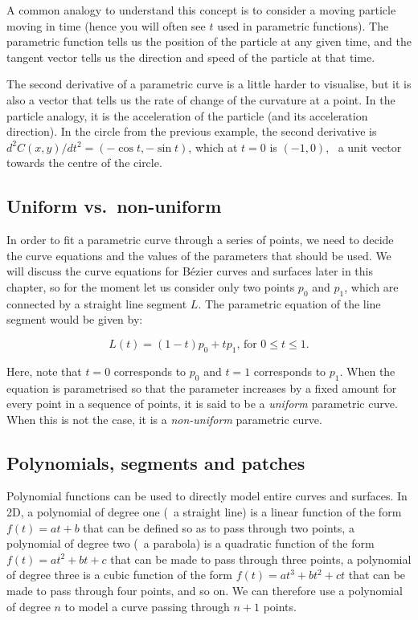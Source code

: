 A common analogy to understand this concept is to consider a moving particle moving in time (hence you will often see \(t\) used in parametric functions).
The parametric function tells us the position of the particle at any given time, and the tangent vector tells us the direction and speed of the particle at that time.

The second derivative of a parametric curve is a little harder to visualise, but it is also a vector that tells us the rate of change of the curvature at a point.
In the particle analogy, it is the acceleration of the particle (and its acceleration direction).
In the circle from the previous example, the second derivative is \(d^2C(x,y)/dt^2 = (-\cos t, -\sin t)\), which at \(t=0\) is \((-1, 0)\), \ie\ a unit vector towards the centre of the circle.

\subsection{Uniform vs.\ non-uniform}

In order to fit a parametric curve through a series of points, we need to decide the curve equations and the values of the parameters that should be used.
We will discuss the curve equations for B\'ezier curves and surfaces later in this chapter, so for the moment let us consider only two points \(p_0\) and \(p_1\), which are connected by a straight line segment \(L\).
The parametric equation of the line segment would be given by:

\begin{equation}
\label{eq:line}
L(t) = (1-t)p_0 + tp_1\text{, for }0 \leq t \leq 1.
\end{equation}

Here, note that \(t=0\) corresponds to \(p_0\) and \(t=1\) corresponds to \(p_1\).
When the equation is parametrised so that the parameter increases by a fixed amount for every point in a sequence of points, it is said to be a \emph{uniform} parametric curve.
When this is not the case, it is a \emph{non-uniform} parametric curve.

\subsection{Polynomials, segments and patches}

Polynomial functions can be used to directly model entire curves and surfaces.
In 2D, a polynomial of degree one (\ie\ a straight line) is a linear function of the form \(f(t) = at+b\) that can be defined so as to pass through two points, a polynomial of degree two (\ie\ a parabola) is a quadratic function of the form \(f(t)=at^2+bt+c\) that can be made to pass through three points, a polynomial of degree three is a cubic function of the form \(f(t)=at^3+bt^2+ct\) that can be made to pass through four points, and so on.
We can therefore use a polynomial of degree \(n\) to model a curve passing through \(n+1\) points.

